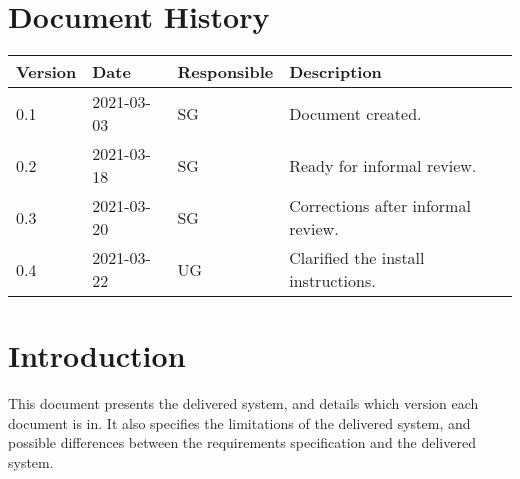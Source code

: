 \documentclass{article}
\date {#1}
\title {
    \documentNumber {01}    
    
    \documentVersion {0.4}
    
    \documentTitle {Template}
    \documentGroup {2}
    
    \documentResponsible {System Group}
    \documentAuthors {System Group}
    
    \documentDate {2021-03-22}
}
\begin{document}
\maketitle
\thispagestyle{empty}

\newpage

\tableofcontents

\newpage



\section{Document History}

\begin{tabular}{ l | l | l | l }
    Version & Date & Responsible & Description \\
    \hline
    0.1 & 2021-03-03 & SG & Document created. \\
    \hline
    0.2 & 2021-03-18 & SG & Ready for informal review. \\
    \hline
    0.3 & 2021-03-20 & SG & Corrections after informal review. \\
    \hline
    0.4 & 2021-03-22 & UG & Clarified the install instructions.
   
\end{tabular}

\section{Introduction}
    This document presents the delivered system, and details which version each document is in. It also specifies the limitations of the delivered system, and possible differences between the requirements specification and the delivered system.
\end{document}
